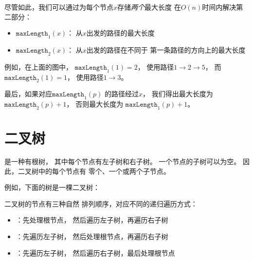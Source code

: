 尽管如此，我们可以通过为每个节点$x$存储\emph{两个}最大长度
在$O(n)$时间内解决第二部分：
\begin{itemize}
\item $\texttt{maxLength}_1(x)$：
从$x$出发的路径的最大长度
\item $\texttt{maxLength}_2(x)$：
从$x$出发的路径在不同于
第一条路径的方向上的最大长度
\end{itemize}
例如，在上面的图中，
$\texttt{maxLength}_1(1)=2$，
使用路径$1 \rightarrow 2 \rightarrow 5$，
而$\texttt{maxLength}_2(1)=1$，
使用路径$1 \rightarrow 3$。

最后，如果对应$\texttt{maxLength}_1(p)$
的路径经过$x$，
我们得出最大长度为
$\texttt{maxLength}_2(p)+1$，
否则最大长度为
$\texttt{maxLength}_1(p)+1$。


\section{二叉树}


\begin{samepage}
是一种有根树，
其中每个节点有左子树和右子树。
一个节点的子树可以为空。
因此，二叉树中的每个节点有
零个、一个或两个子节点。

例如，下面的树是一棵二叉树：
\begin{center}
\end{center}
\end{samepage}


二叉树的节点有三种自然
排列顺序，对应不同的递归遍历方式：

\begin{itemize}
\item {}：先处理根节点，
然后遍历左子树，再遍历右子树
\item {}：先遍历左子树，
然后处理根节点，再遍历右子树
\item {}：先遍历左子树，
然后遍历右子树，最后处理根节点
\end{itemize}


